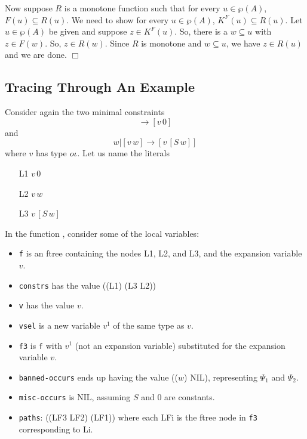 Now suppose $R$ is a monotone function such that for every $u\in\wp(A)$,
$F(u)\subseteq R(u)$.  We need to show for every $u\in\wp(A)$, $K^F(u)\subseteq R(u)$.
Let $u\in\wp(A)$ be given and suppose $z\in K^F(u)$.  So, there is a $w\subseteq u$
with $z\in F(w)$.  So, $z\in R(w)$.  Since $R$ is monotone and $w\subseteq u$,
we have $z\in R(u)$ and we are done.
$\Box$

\subsection{Tracing Through An Example}

Consider again the two minimal constraints
$$\rightarrow [v\, 0]$$
and
$$w | [v\, w] \rightarrow [v\, [S\, w]]$$
where $v$ has type $o\iota$.
Let us name the literals
\begin{itemize}
\item [L1] $v\, 0$
\item [L2] $v\, w$
\item [L3] $v\, [S\, w]$
\end{itemize}
In the function ,
consider some of the local variables:
\begin{itemize}
\item \verb+f+ is an ftree containing the nodes L1, L2, and L3,
and the expansion variable $v$.
\item \verb+constrs+ has the value ((L1) (L3 L2))
\item \verb+v+ has the value $v$.
\item \verb+vsel+ is a new variable $v^1$ of the same type as $v$.
\item \verb+f3+ is \verb+f+ with $v^1$ (not an expansion variable)
substituted for the expansion variable $v$.
\item \verb+banned-occurs+ ends up having the value (($w$) NIL),
representing $\Psi_1$ and $\Psi_2$.
\item \verb+misc-occurs+ is NIL, assuming $S$ and $0$ are constants.
\item \verb+paths+: ((LF3 LF2) (LF1)) where each LFi
is the ftree node in \verb+f3+ corresponding to Li.
\end{itemize}

